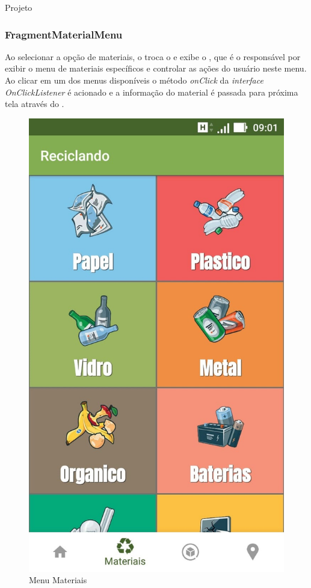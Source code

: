 \documentclass[
	12pt,				%
	openright,			%
	twoside,			%
	a4paper,			%
	english,			%
	french,				%
	spanish,			%
	brazil				%
	]{abntex2}
\begin{document}
\begin{chapter}{Projeto}
\subsubsection{FragmentMaterialMenu} \label{FragmentMaterialMenu}
Ao selecionar a opção de materiais, o  troca o  e exibe o , que é o  responsável por exibir o menu de materiais específicos e controlar as ações do usuário neste menu. Ao clicar em um dos menus disponíveis o método \textit{onClick} da \textit{interface} \textit{OnClickListener} é acionado e a informação do material é passada para próxima tela através do .
\
    \begin{figure}[htb]    
 \centering
  \begin{minipage}{0.45\textwidth}
    \centering
    \caption{Menu Materiais}
    \includegraphics[scale=0.35]{media/tela_menu_material_1.jpg}

\end{minipage}
\end{figure}
\end{chapter}
\end{document}
